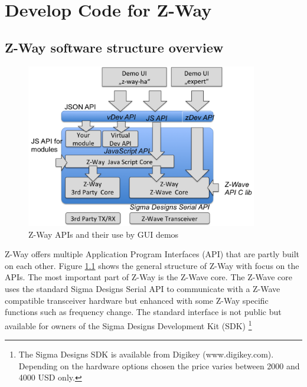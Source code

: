 \chapter{Develop Code for Z-Way}
\label{c:developer}


\section{Z-Way software structure overview}

\begin{figure}
\includegraphics[width=0.9\textwidth]{pngs/cap11/apis.png}
\caption{Z-Way APIs and their use by GUI demos}
\label{apis}
\end{figure}

Z-Way offers multiple Application Program Interfaces (API) that are partly built on each 
other. Figure \ref{apis} shows the general structure of Z-Way with focus on the APIs. The 
most important part of Z-Way is the Z-Wave core. The Z-Wave core uses the standard Sigma 
Designs Serial API to communicate with a Z-Wave compatible transceiver hardware but enhanced 
with some Z-Way specific functions such as frequency change. The standard interface is 
not public but available for owners of the Sigma Designs Development Kit (SDK)
\footnote{The Sigma Designs SDK is available from Digikey (www.digikey.com). Depending 
on the hardware options chosen the price varies between 2000 and 4000 USD only.}

